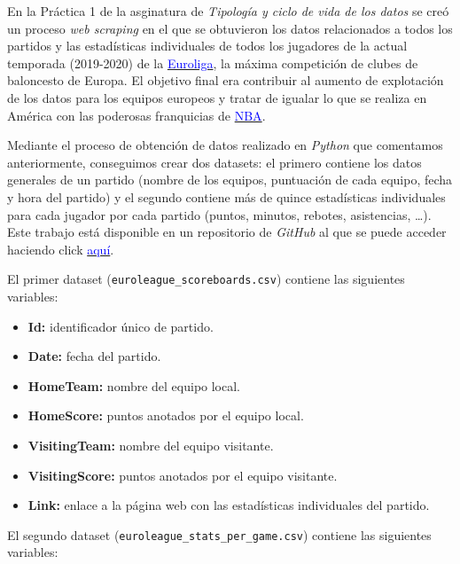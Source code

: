 \documentclass[
]{article}
\providecommand{\tightlist}{%
  \setlength{\itemsep}{0pt}\setlength{\parskip}{0pt}}
\begin{document}
En la Práctica 1 de la asginatura de \emph{Tipología y ciclo de vida de
los datos} se creó un proceso \emph{web scraping} en el que se
obtuvieron los datos relacionados a todos los partidos y las
estadísticas individuales de todos los jugadores de la actual temporada
(2019-2020) de la
\href{https://www.euroleague.net/}{\textcolor{blue}{Euroliga}}, la
máxima competición de clubes de baloncesto de Europa. El objetivo final
era contribuir al aumento de explotación de los datos para los equipos
europeos y tratar de igualar lo que se realiza en América con las
poderosas franquicias de
\href{https://es.nba.com/?gr=www}{\textcolor{blue}{NBA}}.

Mediante el proceso de obtención de datos realizado en \emph{Python} que
comentamos anteriormente, conseguimos crear dos datasets: el primero
contiene los datos generales de un partido (nombre de los equipos,
puntuación de cada equipo, fecha y hora del partido) y el segundo
contiene más de quince estadísticas individuales para cada jugador por
cada partido (puntos, minutos, rebotes, asistencias, \ldots). Este
trabajo está disponible en un repositorio de \emph{GitHub} al que se
puede acceder haciendo click
\href{https://github.com/aarzola-uoc/practica1-tycvd}{\textcolor{blue}{aquí}}.

El primer dataset (\texttt{euroleague\_scoreboards.csv}) contiene las
siguientes variables:

\begin{itemize}
\tightlist
\item
  \textbf{Id:} identificador único de partido.
\item
  \textbf{Date:} fecha del partido.
\item
  \textbf{HomeTeam:} nombre del equipo local.
\item
  \textbf{HomeScore:} puntos anotados por el equipo local.
\item
  \textbf{VisitingTeam:} nombre del equipo visitante.
\item
  \textbf{VisitingScore:} puntos anotados por el equipo visitante.
\item
  \textbf{Link:} enlace a la página web con las estadísticas
  individuales del partido.
\end{itemize}

El segundo dataset (\texttt{euroleague\_stats\_per\_game.csv}) contiene
las siguientes variables:
\end{document}
